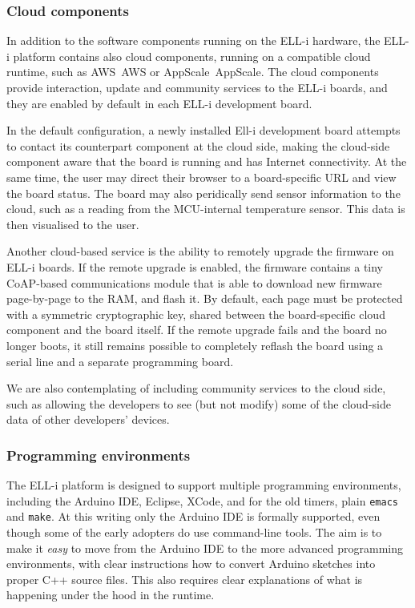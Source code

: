 \documentclass[draft,a4paper]{siamltex}
\begin{document}
\subsubsection{Cloud components}

In addition to the software components running on the ELL-i hardware,
the ELL-i platform contains also cloud components, running on a
compatible cloud runtime, such as AWS~{AWS} or AppScale~{AppScale}.
The cloud components provide interaction, update and community
services to the ELL-i boards, and they are enabled by default in each
ELL-i development board.

In the default configuration, a newly installed Ell-i development
board attempts to contact its counterpart component at the cloud
side, making the cloud-side component aware that the board is running
and has Internet connectivity.  At the same time, the user may direct
their browser to a board-specific URL and view the board status.  The
board may also peridically send sensor information to the cloud, such
as a reading from the MCU-internal temperature sensor.  This data is
then visualised to the user.

Another cloud-based service is the ability to remotely upgrade the
firmware on ELL-i boards.  If the remote upgrade is enabled, the
firmware contains a tiny CoAP-based communications module that is able
to download new firmware page-by-page to the RAM, and flash it.  By
default, each page must be protected with a symmetric cryptographic
key, shared between the board-specific cloud component and the board
itself.  If the remote upgrade fails and the board no longer boots, it
still remains possible to completely reflash the board using a serial
line and a separate programming board.

We are also contemplating of including community services to the cloud
side, such as allowing the developers to see (but not modify) some of
the cloud-side data of other developers' devices.

\subsubsection{Programming environments}

The ELL-i platform is designed to support multiple programming
environments, including the Arduino IDE, Eclipse, XCode, and for the
old timers, plain \hbox{\tt emacs} and \hbox{\tt make}.  At this
writing only the Arduino IDE is formally supported, even though some
of the early adopters do use command-line tools.  The aim is to make
it {\it easy} to move from the Arduino IDE to the more advanced
programming environments, with clear instructions how to convert
Arduino sketches into proper C++ source files.  This also requires
clear explanations of what is happening under the hood in the runtime.
\end{document}

